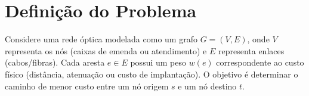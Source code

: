 \section{Definição do Problema}

Considere uma rede óptica modelada como um grafo $G=(V,E)$,
onde $V$ representa os nós (caixas de emenda ou atendimento) e $E$ representa enlaces (cabos/fibras).
Cada aresta $e \in E$ possui um peso $w(e)$ correspondente ao custo físico (distância, atenuação ou custo de implantação).
O objetivo é determinar o caminho de menor custo entre um nó origem $s$ e um nó destino $t$.
